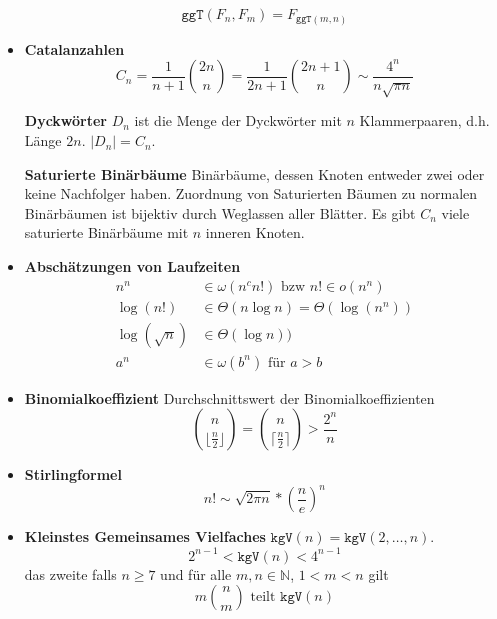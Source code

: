 \documentclass[landscape, 8pt, a4paper]{extarticle}
\newcommand{\ggT}{\texttt{ggT}}
\newcommand{\kgV}{\texttt{kgV}}
\newcommand{\N}{\mathbb{N}}
\begin{document}
\begin{multicols}{3}
\begin{itemize}
		\begin{equation*}
			\ggT(F_n,F_m)=F_{\ggT(m,n)}
		\end{equation*}

		\item \textbf{Catalanzahlen}
		\begin{equation*}
			C_n=\frac{1}{n+1}\binom{2n}{n}=\frac{1}{2n+1}\binom{2n+1}{n}\sim\frac{4^n}{n\sqrt{\pi n}}
		\end{equation*}

		\textbf{Dyckwörter} $D_n$ ist die Menge der Dyckwörter mit $n$ Klammerpaaren, d.h. Länge $2n$. $|D_n|=C_n$.

		\textbf{Saturierte Binärbäume} Binärbäume, dessen Knoten entweder zwei oder keine Nachfolger haben. Zuordnung von Saturierten Bäumen zu normalen Binärbäumen ist bijektiv durch Weglassen aller Blätter. Es gibt $C_n$ viele saturierte Binärbäume mit $n$ inneren Knoten.

		\item \textbf{Abschätzungen von Laufzeiten}
		\begin{align*}
			n^n&\in \omega(n^c n!) \text{ bzw } n! \in o(n^n)\\
			\log(n!)&\in\Theta (n\log n)=\Theta(\log(n^n))\\
			\log(\sqrt n)&\in \Theta(\log n))\\
			a^n &\in \omega(b^n) \text{ für } a>b
		\end{align*}

		\item \textbf{Binomialkoeffizient} Durchschnittswert der Binomialkoeffizienten
		\begin{equation*}
			\binom{n}{\lfloor\frac{n}{2}\rfloor}=\binom{n}{\lceil\frac{n}{2}\rceil}>\frac{2^n}{n}
		\end{equation*}

		\item \textbf{Stirlingformel}
		\begin{equation*}
			n!\sim \sqrt{2\pi n}*(\frac ne)^n
		\end{equation*}

		\item \textbf{Kleinstes Gemeinsames Vielfaches} 
		$\kgV(n)=\kgV(2,\ldots,n)$. \begin{equation*}
			2^{n-1}<\kgV(n)<4^{n-1}
		\end{equation*}
		das zweite falls $n\geq 7$
		und für alle $m,n\in\N$, $1<m<n$ gilt
		\begin{equation*}
			m\binom nm \text{ teilt } \kgV(n)
		\end{equation*}
			

\end{itemize}
\end{multicols}
\end{document}
